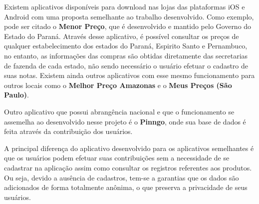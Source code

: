 Existem aplicativos disponíveis para download nas lojas das plataformas iOS e Android com uma proposta semelhante ao trabalho desenvolvido. Como exemplo, pode ser citado o \textbf{Menor Preço}\cite{menorPrecoApp}, que é desenvolvido e mantido pelo Governo do Estado do Paraná. Através desse aplicativo, é possível consultar os preços de qualquer estabelecimento dos estados do Paraná, Espirito Santo e Pernambuco, no entanto, as informações das compras são obtidas diretamente das secretarias de fazenda de cada estado, não sendo necessário o usuário efetuar o cadastro de suas notas. Existem ainda outros aplicativos com esse mesmo funcionamento para outros locais como o \textbf{Melhor Preço Amazonas}\cite{melhorPrecoAmazonasApp} e o \textbf{Meus Preços (São Paulo)}\cite{meusPrecosApp}.

Outro aplicativo que possui abrangência nacional e que o funcionamento se assemelha ao desenvolvido nesse projeto é o \textbf{Pinngo}\cite{pinngoApp}, onde sua base de dados é feita através da contribuição dos usuários.

A principal diferença do aplicativo desenvolvido para os aplicativos semelhantes é que os usuários podem efetuar suas contribuições sem a necessidade de se cadastrar na aplicação assim como consultar os registros referentes aos produtos. Ou seja, devido a ausência de cadastros, tem-se a garantias que os dados são adicionados de forma totalmente anônima, o que preserva a privacidade de seus usuários.